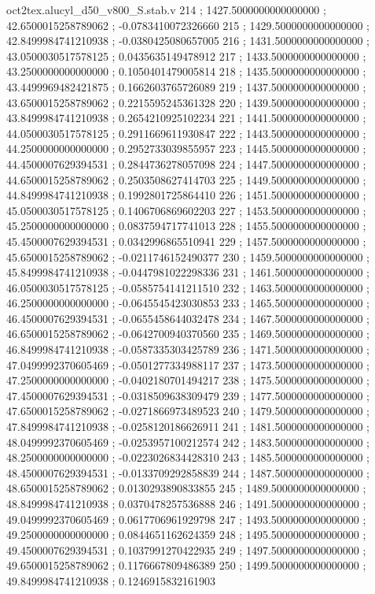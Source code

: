 \begin{filecontents}[overwrite]{oct2tex.alucyl_d50_v800_S.stab.v}
214 ; 1427.5000000000000000 ; 42.6500015258789062 ; -0.0783410072326660
215 ; 1429.5000000000000000 ; 42.8499984741210938 ; -0.0380425080657005
216 ; 1431.5000000000000000 ; 43.0500030517578125 ; 0.0435635149478912
217 ; 1433.5000000000000000 ; 43.2500000000000000 ; 0.1050401479005814
218 ; 1435.5000000000000000 ; 43.4499969482421875 ; 0.1662603765726089
219 ; 1437.5000000000000000 ; 43.6500015258789062 ; 0.2215595245361328
220 ; 1439.5000000000000000 ; 43.8499984741210938 ; 0.2654210925102234
221 ; 1441.5000000000000000 ; 44.0500030517578125 ; 0.2911669611930847
222 ; 1443.5000000000000000 ; 44.2500000000000000 ; 0.2952733039855957
223 ; 1445.5000000000000000 ; 44.4500007629394531 ; 0.2844736278057098
224 ; 1447.5000000000000000 ; 44.6500015258789062 ; 0.2503508627414703
225 ; 1449.5000000000000000 ; 44.8499984741210938 ; 0.1992801725864410
226 ; 1451.5000000000000000 ; 45.0500030517578125 ; 0.1406706869602203
227 ; 1453.5000000000000000 ; 45.2500000000000000 ; 0.0837594717741013
228 ; 1455.5000000000000000 ; 45.4500007629394531 ; 0.0342996865510941
229 ; 1457.5000000000000000 ; 45.6500015258789062 ; -0.0211746152490377
230 ; 1459.5000000000000000 ; 45.8499984741210938 ; -0.0447981022298336
231 ; 1461.5000000000000000 ; 46.0500030517578125 ; -0.0585754141211510
232 ; 1463.5000000000000000 ; 46.2500000000000000 ; -0.0645545423030853
233 ; 1465.5000000000000000 ; 46.4500007629394531 ; -0.0655458644032478
234 ; 1467.5000000000000000 ; 46.6500015258789062 ; -0.0642700940370560
235 ; 1469.5000000000000000 ; 46.8499984741210938 ; -0.0587335303425789
236 ; 1471.5000000000000000 ; 47.0499992370605469 ; -0.0501277334988117
237 ; 1473.5000000000000000 ; 47.2500000000000000 ; -0.0402180701494217
238 ; 1475.5000000000000000 ; 47.4500007629394531 ; -0.0318509638309479
239 ; 1477.5000000000000000 ; 47.6500015258789062 ; -0.0271866973489523
240 ; 1479.5000000000000000 ; 47.8499984741210938 ; -0.0258120186626911
241 ; 1481.5000000000000000 ; 48.0499992370605469 ; -0.0253957100212574
242 ; 1483.5000000000000000 ; 48.2500000000000000 ; -0.0223026834428310
243 ; 1485.5000000000000000 ; 48.4500007629394531 ; -0.0133709292858839
244 ; 1487.5000000000000000 ; 48.6500015258789062 ; 0.0130293890833855
245 ; 1489.5000000000000000 ; 48.8499984741210938 ; 0.0370478257536888
246 ; 1491.5000000000000000 ; 49.0499992370605469 ; 0.0617706961929798
247 ; 1493.5000000000000000 ; 49.2500000000000000 ; 0.0844651162624359
248 ; 1495.5000000000000000 ; 49.4500007629394531 ; 0.1037991270422935
249 ; 1497.5000000000000000 ; 49.6500015258789062 ; 0.1176667809486389
250 ; 1499.5000000000000000 ; 49.8499984741210938 ; 0.1246915832161903

\end{filecontents}
